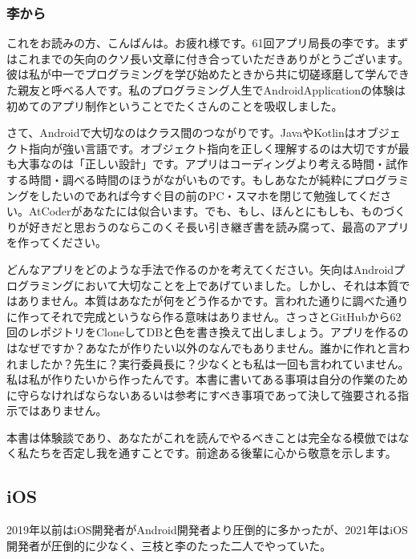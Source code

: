 \documentclass[dvipdfmx,jb5]{jarticle}
\begin{document}
 \subsubsection{李から}
 これをお読みの方、こんばんは。お疲れ様です。61回アプリ局長の李です。まずはこれまでの矢向のクソ長い文章に付き合っていただきありがとうございます。彼は私が中一でプログラミングを学び始めたときから共に切磋琢磨して学んできた親友と呼べる人です。私のプログラミング人生でAndroidApplicationの体験は初めてのアプリ制作ということでたくさんのことを吸収しました。

 さて、Androidで大切なのはクラス間のつながりです。JavaやKotlinはオブジェクト指向が強い言語です。オブジェクト指向を正しく理解するのは大切ですが最も大事なのは「正しい設計」です。アプリはコーディングより考える時間・試作する時間・調べる時間のほうがながいものです。もしあなたが純粋にプログラミングをしたいのであれば今すぐ目の前のPC・スマホを閉じて勉強してください。AtCoderがあなたには似合います。でも、もし、ほんとにもしも、ものづくりが好きだと思おうのならこのくそ長い引き継ぎ書を読み腐って、最高のアプリを作ってください。

 どんなアプリをどのような手法で作るのかを考えてください。矢向はAndroidプログラミングにおいて大切なことを上であげていました。しかし、それは本質ではありません。本質はあなたが何をどう作るかです。言われた通りに調べた通りに作ってそれで完成というなら作る意味はありません。さっさとGitHubから62回のレポジトリをCloneしてDBと色を書き換えて出しましょう。アプリを作るのはなぜですか？あなたが作りたい以外のなんでもありません。誰かに作れと言われましたか？先生に？実行委員長に？少なくとも私は一回も言われていません。私は私が作りたいから作ったんです。本書に書いてある事項は自分の作業のために守らなければならないあるいは参考にすべき事項であって決して強要される指示ではありません。

 本書は体験談であり、あなたがこれを読んでやるべきことは完全なる模倣ではなく私たちを否定し我を通すことです。前途ある後輩に心から敬意を示します。
 \subsection{iOS}
 2019年以前はiOS開発者がAndroid開発者より圧倒的に多かったが、2021年はiOS開発者が圧倒的に少なく、三枝と李のたった二人でやっていた。
\end{document}
